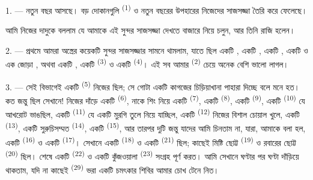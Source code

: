 %
%

\VUsaut{4.0mm}
\VUsaut{2.0mm}
\VUsaut{3.4mm}

1. --- নতুন বছর আসছে। বড় দোকানগুলি  \textsuperscript{(1)} ও
নতুন বছরের উপহারের নিজেদের সাজসজ্জা তৈরি করে ফেলেছে।

আমি নিজের দাদুকে বললাম যে আমাকে এই সুন্দর সাজসজ্জা দেখতে বাজারে নিয়ে চলুন,
আর তিনি রাজি হলেন।

2. --- প্রথমে আমরা অস্ত্রের কয়েকটি সুন্দর সাজসজ্জার সামনে থামলাম, যাতে ছিল
একটি , একটি , একটি ,
একটি  ও এক জোড়া , অথবা একটি
, একটি  \textsuperscript{(3)} ও একটি
 \textsuperscript{(4)}। এই সব আমার 
\textsuperscript{(2)} চেয়ে অনেক বেশি ভালো লাগল।

\VUsaut{3.0mm}
\VUsaut{2.6mm}

3. --- সেই বিভাগেই একটি  \textsuperscript{(5)} নিজের
 ছিল; সে গোটা একটি কাগজের চিড়িয়াখানা পাহারা দিচ্ছে বলে
মনে হত। কত জন্তু ছিল সেখানে! নিজের দাঁড়ে একটি 
\textsuperscript{(6)}, নাকে শিং নিয়ে একটি  \textsuperscript{(7)},
একটি  \textsuperscript{(8)}, একটি 
\textsuperscript{(9)}, একটি  \textsuperscript{(10)} যে আখরোট
ভাঙছিল, একটি  \textsuperscript{(11)} যে একটি মুরগি তুলে নিয়ে
যাচ্ছিল, একটি  \textsuperscript{(12)} নিজের বিশাল চোয়াল খুলে,
একটি  \textsuperscript{(13)}, একটি সুরুচিসম্মত 
\textsuperscript{(14)}, একটি  \textsuperscript{(15)}, আর তারপর
দুটি জন্তু যাদের আমি চিনতাম না, যারা, আমাকে বলা হল, একটি 
\textsuperscript{(16)} ও একটি  \textsuperscript{(17)}। সেখানে
একটি  \textsuperscript{(18)} ও একটি 
\textsuperscript{(21)} ছিল; কাছেই মিষ্টি ছোট্ট 
\textsuperscript{(19)} ও রবারের ছোট্ট  \textsuperscript{(20)} ছিল।
শেষে একটি  \textsuperscript{(22)} ও একটি কুঁজওয়ালা
 \textsuperscript{(23)} সংগ্রহ পূর্ণ করত। আমি সেখানে ঘণ্টার পর ঘণ্টা
দাঁড়িয়ে থাকতাম, যদি না কাছেই  \textsuperscript{(29)}
ভরা একটি চমৎকার শিবির আমার চোখ টেনে নিত।

